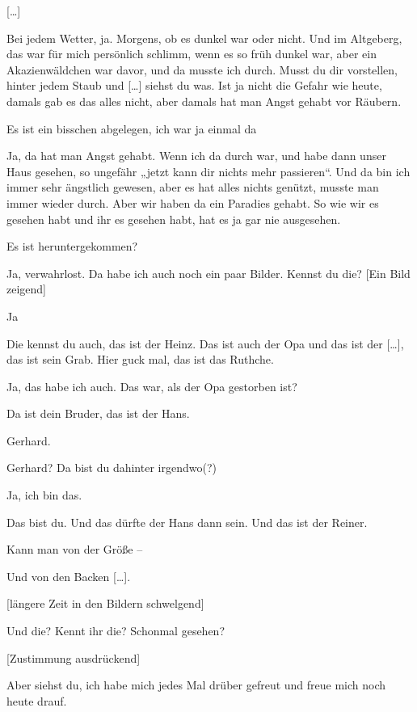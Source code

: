 \documentclass[ngerman,]{article}
\providecommand{\tightlist}{%
  \setlength{\itemsep}{0pt}\setlength{\parskip}{0pt}}
\begin{document}
\begin{multicols}{3}
{[}\ldots{}{]}

\begin{description}
\tightlist
\item[Käthe]
Bei jedem Wetter, ja. Morgens, ob es dunkel war oder nicht. Und im
Altgeberg, das war für mich persönlich schlimm, wenn es so früh dunkel
war, aber ein Akazienwäldchen war davor, und da musste ich durch. Musst
du dir vorstellen, hinter jedem Staub und {[}\ldots{}{]} siehst du was.
Ist ja nicht die Gefahr wie heute, damals gab es das alles nicht, aber
damals hat man Angst gehabt vor Räubern.
\item[Ruth]
Es ist ein bisschen abgelegen, ich war ja einmal da
\item[Käthe]
Ja, da hat man Angst gehabt. Wenn ich da durch war, und habe dann unser
Haus gesehen, so ungefähr „jetzt kann dir nichts mehr passieren“. Und da
bin ich immer sehr ängstlich gewesen, aber es hat alles nichts genützt,
musste man immer wieder durch. Aber wir haben da ein Paradies gehabt. So
wie wir es gesehen habt und ihr es gesehen habt, hat es ja gar nie
ausgesehen.
\item[Ruth]
Es ist heruntergekommen?
\item[Käthe]
Ja, verwahrlost. Da habe ich auch noch ein paar Bilder. Kennst du die?
{[}Ein Bild zeigend{]}
\item[Ruth]
Ja
\item[Käthe]
Die kennst du auch, das ist der Heinz. Das ist auch der Opa und das ist
der {[}\ldots{}{]}, das ist sein Grab. Hier guck mal, das ist das
Ruthche.
\item[Ruth]
Ja, das habe ich auch. Das war, als der Opa gestorben ist?
\item[Käthe]
Da ist dein Bruder, das ist der Hans.
\item[Ruth]
Gerhard.
\item[Käthe]
Gerhard? Da bist du dahinter irgendwo(?)
\item[Ruth]
Ja, ich bin das.
\item[Käthe]
Das bist du. Und das dürfte der Hans dann sein. Und das ist der Reiner.
\item[Ruth]
Kann man von der Größe –
\item[Käthe]
Und von den Backen {[}\ldots{}{]}.
\end{description}

{[}längere Zeit in den Bildern schwelgend{]}

\begin{description}
\tightlist
\item[Käthe]
Und die? Kennt ihr die? Schonmal gesehen?
\item[Ruth]
{[}Zustimmung ausdrückend{]}
\item[Käthe]
Aber siehst du, ich habe mich jedes Mal drüber gefreut und freue mich
noch heute drauf.
\end{description}


\end{multicols}
\end{document}

